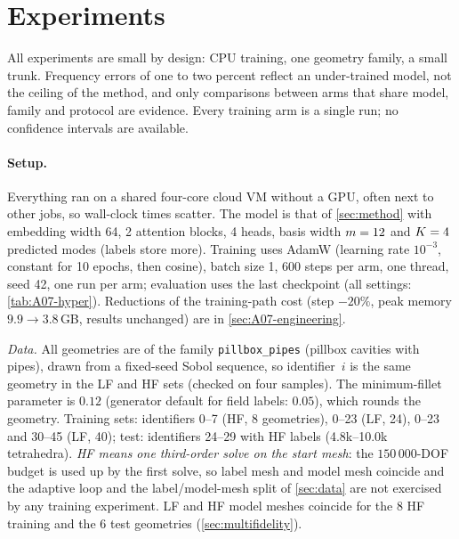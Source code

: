 \section{Experiments}\label{sec:experiments}

All experiments are small by design: CPU training, one geometry family, a small trunk. Frequency errors of one to two percent reflect an under-trained model, not the ceiling of the method, and only comparisons between arms that share model, family and protocol are evidence. Every training arm is a single run; no confidence intervals are available.

\paragraph{Setup.}
Everything ran on a shared four-core cloud VM without a GPU, often next to other jobs, so wall-clock times scatter. The model is that of \cref{sec:method} with embedding width 64, 2 attention blocks, 4 heads, basis width $m=12$ and $K=4$ predicted modes (labels store more). Training uses AdamW (learning rate $10^{-3}$, constant for 10 epochs, then cosine), batch size 1, 600 steps per arm, one thread, seed 42, one run per arm; evaluation uses the last checkpoint (all settings: \cref{tab:A07-hyper}). Reductions of the training-path cost (step $-20\%$, peak memory $9.9\to3.8$\,GB, results unchanged) are in \cref{sec:A07-engineering}.


\emph{Data.} All geometries are of the family \texttt{pillbox\_pipes} (pillbox cavities with pipes), drawn from a fixed-seed Sobol sequence, so identifier~$i$ is the same
geometry in the LF and HF sets (checked on four samples). The minimum-fillet parameter is $0.12$ (generator default for field labels: $0.05$), which rounds the geometry.
Training sets: identifiers 0--7 (HF, 8 geometries), 0--23 (LF, 24), 0--23 and 30--45 (LF, 40); test: identifiers 24--29 with HF labels (4.8k--10.0k tetrahedra). \emph{HF means one third-order solve on the start mesh}: the $150\,000$-DOF budget is used up by the first solve, so label mesh and model mesh coincide and the adaptive loop and the label/model-mesh split of \cref{sec:data} are not exercised by any training experiment.
LF and HF model meshes coincide for the 8 HF training and the 6 test geometries (\cref{sec:multifidelity}).

